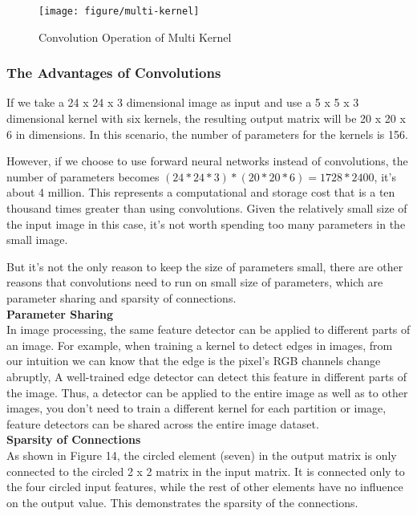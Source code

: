 \documentclass{article}
\begin{document}
\begin{figure}[htbp]
        \centering
        \texttt{[image: figure/multi-kernel]}
        \caption{Convolution Operation of Multi Kernel}
     \end{figure}
     

\newpage
\subsubsection{The Advantages of Convolutions}
If we take a 24 x 24 x 3 dimensional image as input and use a 5 x 5 x 3 dimensional kernel with six kernels, the resulting output matrix will be 20 x 20 x 6 in dimensions. In this scenario, the number of parameters for the kernels is 156.

However, if we choose to use forward neural networks instead of convolutions, the number of parameters becomes $(24 * 24 * 3) * (20 * 20 * 6) = 1728 * 2400 $, it's about 4 million. This represents a computational and storage cost that is a ten thousand times greater than using convolutions. Given the relatively small size of the input image in this case, it's not worth spending too many parameters in the small image.

But it's not the only reason to keep the size of parameters small, there are other reasons that convolutions need to run on small size of parameters, which are parameter sharing and sparsity of connections.\\



\noindent
\textbf{Parameter Sharing}\\
\noindent
In image processing, the same feature detector can be applied to different parts of an image. For example, when training a kernel to detect edges in images, from our intuition we can know that the edge is the pixel's RGB channels change abruptly, A well-trained edge detector can detect this feature in different parts of the image. Thus, a detector can be applied to the entire image as well as to other images, you don't need to train a different kernel for each partition or image, feature detectors can be shared across the entire image dataset.\\

\noindent
\textbf{Sparsity of Connections}\\
\noindent
As shown in Figure 14, the circled element (seven) in the output matrix is only connected to the circled 2 x 2 matrix in the input matrix. It is connected only to the four circled input features, while the rest of other elements have no influence on the output value. This demonstrates the sparsity of the connections.
\end{document}
